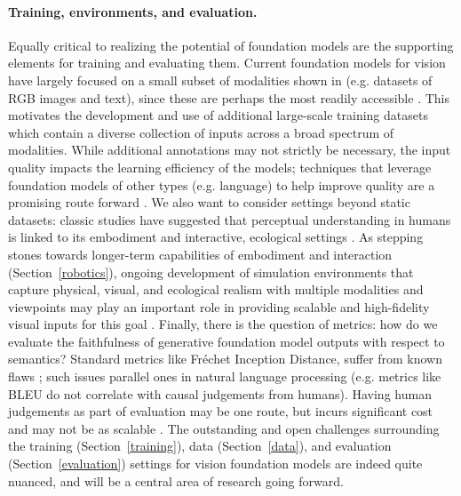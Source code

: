 \paragraph{Training, environments, and evaluation.} Equally critical to realizing the potential of foundation models are the supporting elements for training and evaluating them. Current foundation models for vision have largely focused on a small subset of modalities shown in  (e.g. datasets of RGB images and text), since these are perhaps the most readily accessible \cite{changpinyo2021cc12m,radford2021learning}. This motivates the development and use of additional large-scale training datasets which contain a diverse collection of inputs across a broad spectrum of modalities. While additional annotations may not strictly be necessary, the input quality impacts the learning efficiency of the models; techniques that leverage foundation models of other types (e.g. language) to help improve quality are a promising route forward \cite{zellers2021merlot}. We also want to consider settings beyond static datasets: classic studies have suggested that perceptual understanding in humans is linked to its embodiment and interactive, ecological settings \cite{gibson1979ecological}. As stepping stones towards longer-term capabilities of embodiment and interaction (Section~\ref{robotics}), ongoing development of simulation environments that capture physical, visual, and ecological realism with multiple modalities and viewpoints may play an important role in providing scalable and high-fidelity visual inputs for this goal \cite{kolve2017ai2thor,habitat19iccv,gan2020threedworld,shen2021igibson,srivastava2021behavior}. Finally, there is the question of metrics: how do we evaluate the faithfulness of generative foundation model outputs with respect to semantics? Standard metrics like Fr\'{e}chet Inception Distance, suffer from known flaws \cite{bikowski2018demystifying}; such issues parallel ones in natural language processing (e.g. metrics like BLEU do not correlate with causal judgements from humans). Having human judgements as part of evaluation may be one route, but incurs significant cost and may not be as scalable \cite{zhou2019hype,khashabi2021genie}. The outstanding and open challenges surrounding the training (Section~\ref{training}), data (Section~\ref{data}), and evaluation (Section~\ref{evaluation}) settings for vision foundation models are indeed quite nuanced, and will be a central area of research going forward.

